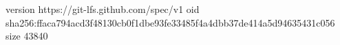 version https://git-lfs.github.com/spec/v1
oid sha256:ffaca794acd3f48130cb0f1dbe93fe33485f4a4dbb37de414a5d94635431c056
size 43840
